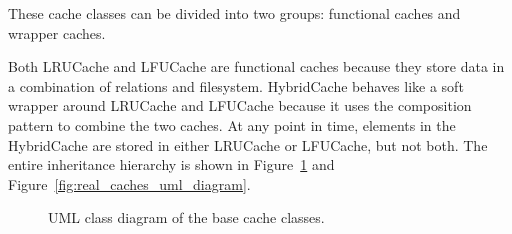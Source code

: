 These cache classes can be divided into two groups: functional caches and wrapper caches.

Both LRUCache and LFUCache are functional caches because they store data
in a combination of relations and filesystem.
HybridCache behaves like a soft wrapper around LRUCache and LFUCache because
it uses the composition pattern to combine the two caches. At any point in time,
elements in the HybridCache are stored in either LRUCache or LFUCache, but not both.
The entire inheritance hierarchy is shown in Figure~\ref{fig:base_cache_uml_diagram}
and Figure~\ref{fig:real_caches_uml_diagram}.

\begin{figure}
    \centering
    \caption{UML class diagram of the base cache classes.}
    \label{fig:base_cache_uml_diagram}
\end{figure}

